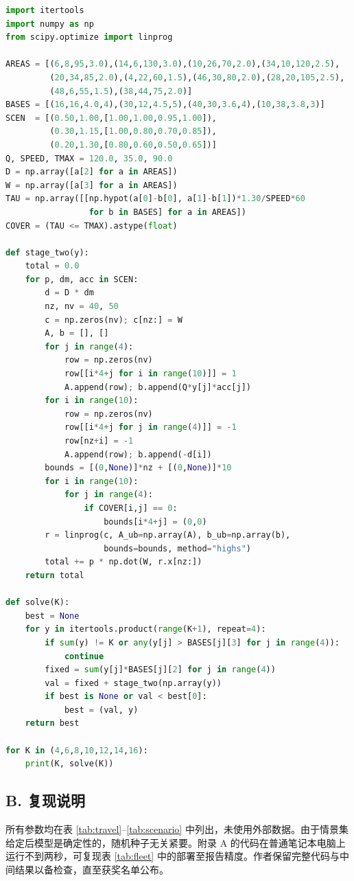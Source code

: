 \documentclass[12pt,a4paper,fontset=windows]{ctexart}
\begin{document}
\begin{lstlisting}[language=Python,caption={两阶段模型的核心代码（节选）。}]
import itertools
import numpy as np
from scipy.optimize import linprog

AREAS = [(6,8,95,3.0),(14,6,130,3.0),(10,26,70,2.0),(34,10,120,2.5),
         (20,34,85,2.0),(4,22,60,1.5),(46,30,80,2.0),(28,20,105,2.5),
         (48,6,55,1.5),(38,44,75,2.0)]
BASES = [(16,16,4.0,4),(30,12,4.5,5),(40,30,3.6,4),(10,38,3.8,3)]
SCEN  = [(0.50,1.00,[1.00,1.00,0.95,1.00]),
         (0.30,1.15,[1.00,0.80,0.70,0.85]),
         (0.20,1.30,[0.80,0.60,0.50,0.65])]
Q, SPEED, TMAX = 120.0, 35.0, 90.0
D = np.array([a[2] for a in AREAS])
W = np.array([a[3] for a in AREAS])
TAU = np.array([[np.hypot(a[0]-b[0], a[1]-b[1])*1.30/SPEED*60
                 for b in BASES] for a in AREAS])
COVER = (TAU <= TMAX).astype(float)

def stage_two(y):
    total = 0.0
    for p, dm, acc in SCEN:
        d = D * dm
        nz, nv = 40, 50
        c = np.zeros(nv); c[nz:] = W
        A, b = [], []
        for j in range(4):
            row = np.zeros(nv)
            row[[i*4+j for i in range(10)]] = 1
            A.append(row); b.append(Q*y[j]*acc[j])
        for i in range(10):
            row = np.zeros(nv)
            row[[i*4+j for j in range(4)]] = -1
            row[nz+i] = -1
            A.append(row); b.append(-d[i])
        bounds = [(0,None)]*nz + [(0,None)]*10
        for i in range(10):
            for j in range(4):
                if COVER[i,j] == 0:
                    bounds[i*4+j] = (0,0)
        r = linprog(c, A_ub=np.array(A), b_ub=np.array(b),
                    bounds=bounds, method="highs")
        total += p * np.dot(W, r.x[nz:])
    return total

def solve(K):
    best = None
    for y in itertools.product(range(K+1), repeat=4):
        if sum(y) != K or any(y[j] > BASES[j][3] for j in range(4)):
            continue
        fixed = sum(y[j]*BASES[j][2] for j in range(4))
        val = fixed + stage_two(np.array(y))
        if best is None or val < best[0]:
            best = (val, y)
    return best

for K in (4,6,8,10,12,14,16):
    print(K, solve(K))
\end{lstlisting}

\subsection*{B. 复现说明}

所有参数均在表 \ref{tab:travel}--\ref{tab:scenario} 中列出，未使用外部数据。由于情景集给定后模型是确定性的，随机种子无关紧要。附录 A 的代码在普通笔记本电脑上运行不到两秒，可复现表 \ref{tab:fleet} 中的部署至报告精度。作者保留完整代码与中间结果以备检查，直至获奖名单公布。
\end{document}
